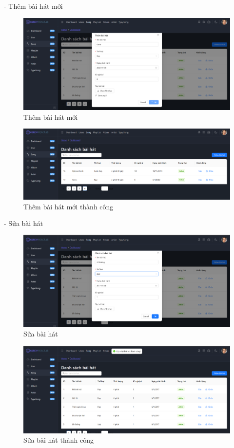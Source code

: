 - Thêm bài hát mới
\begin{figure}[H]
    \centering
    \includegraphics[width=1\textwidth]{imgs/chap5/ql_bai_hat_2.png}
    \caption{Thêm bài hát mới}
\end{figure}
\begin{figure}[H]
    \centering
    \includegraphics[width=1\textwidth]{imgs/chap5/ql_bai_hat_3.png}
    \caption{Thêm bài hát mới thành công}
\end{figure}

- Sửa bài hát
\begin{figure}[H]
    \centering
    \includegraphics[width=1\textwidth]{imgs/chap5/ql_bai_hat_4.png}
    \caption{Sửa bài hát}
\end{figure}
\begin{figure}[H]
    \centering
    \includegraphics[width=1\textwidth]{imgs/chap5/ql_bai_hat_5.png}
    \caption{Sửa bài hát thành công}
\end{figure}

